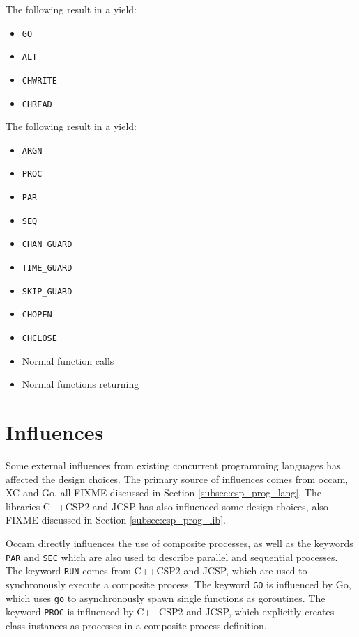 The following \underline{} result in a yield:

\begin{multicols}{2}
\begin{itemize}[topsep=0em,itemsep=-1em,partopsep=0.5em,parsep=1em]
    \item \texttt{GO}
    \item \texttt{ALT}
    \item \texttt{CHWRITE}
    \item \texttt{CHREAD}
\end{itemize}
\end{multicols}

The following \underline{} result in a yield:

\begin{multicols}{2}
\begin{itemize}[topsep=0em,itemsep=-1em,partopsep=0.5em,parsep=1em]
    \item \texttt{ARGN}
    \item \texttt{PROC}
    \item \texttt{PAR}
    \item \texttt{SEQ}
    \item \texttt{CHAN\_GUARD}
    \item \texttt{TIME\_GUARD}
    \item \texttt{SKIP\_GUARD}
    \item \texttt{CHOPEN}
    \item \texttt{CHCLOSE}
    \item Normal function calls
    \item Normal functions returning
\end{itemize}
\end{multicols}


\section{Influences}
\label{sec:influences}

Some external influences from existing concurrent programming languages has affected the design choices. The primary source of influences comes from occam, XC and Go, all FIXME discussed in Section \ref{subsec:csp_prog_lang}. The libraries C++CSP2 and JCSP has also influenced some design choices, also FIXME discussed in Section \ref{subsec:csp_prog_lib}.

Occam directly influences the use of composite processes, as well as the keywords \texttt{PAR} and \texttt{SEC} which are also used to describe parallel and sequential processes. The keyword \texttt{RUN} comes from C++CSP2 and JCSP, which are used to synchronously execute a composite process. The keyword \texttt{GO} is influenced by Go, which uses \texttt{go} to asynchronously spawn single functions as goroutines. The keyword \texttt{PROC} is influenced by C++CSP2 and JCSP, which explicitly creates class instances as processes in a composite process definition. 

